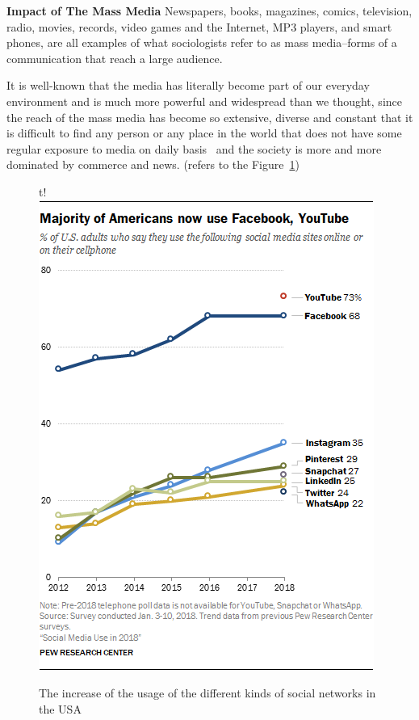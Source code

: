 
\textbf{Impact of The Mass Media}
Newspapers, books, magazines, comics, television, radio, movies, records, video games and the Internet, MP3 players, and smart phones, are all examples of what sociologists refer to as mass media--forms of a communication that reach a large audience. 

It is well-known that the media has literally become part of our everyday environment and is much more powerful and widespread than we thought, since the reach of the mass media has become so extensive, diverse and constant that it is difficult to find any person or any place in the world that does not have some regular exposure to media on daily basis~\citep{callero2017myth} and the society is more and more dominated by commerce and news. (refers to the Figure~\ref{discussion.fig.media})

\begin{figure}{t!}
  \includegraphics[width=\linewidth]{mass_media.png}
  \caption{The increase of the usage of the different kinds of social networks in the USA}
  \label{discussion.fig.media}
\end{figure}

